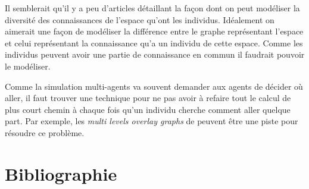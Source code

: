 \documentclass[a4paper]{article}
\begin{document}
Il semblerait qu'il y a peu d'articles détaillant la façon dont on peut
modéliser la diversité des connaissances de l'espace qu'ont les individus.
Idéalement on aimerait une façon de modéliser la différence entre le graphe
représentant l'espace et celui représentant la connaissance qu'a un individu de
cette espace. Comme les individus peuvent avoir une partie de connaissance en
commun il faudrait pouvoir le modéliser.

Comme la simulation multi-agents va souvent demander aux agents de décider où
aller, il faut trouver une technique pour ne pas avoir à refaire tout le calcul
de plus court chemin à chaque fois qu'un individu cherche comment aller quelque
part. Par exemple, les \emph{multi levels overlay graphs} de \cite{holzer2009}
peuvent être une piste pour résoudre ce problème.

\section{Bibliographie}

 
\end{document}
